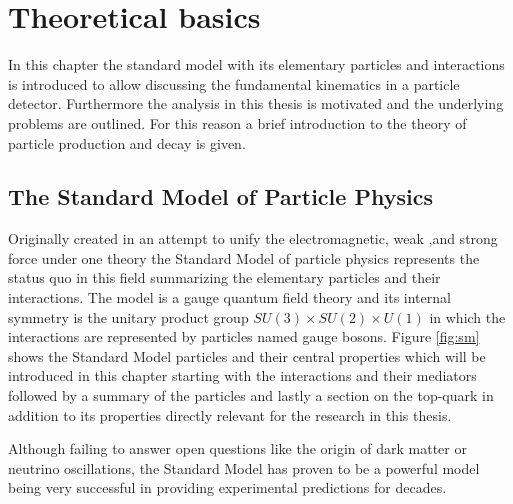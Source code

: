 
\chapter{Theoretical basics}

In this chapter the standard model with its elementary particles and interactions is introduced to allow discussing the fundamental kinematics in a particle detector.
Furthermore the analysis in this thesis is motivated and the underlying problems are outlined. For this reason a brief introduction to the theory of particle production and decay is given.


\section{The Standard Model of Particle Physics}
\label{sec:sm}

Originally created in an attempt to unify the electromagnetic, weak ,and strong force under one theory the Standard Model of particle physics represents the status quo in this field summarizing the elementary particles and their interactions.
The model is a gauge quantum field theory and its internal symmetry is the unitary product group $SU(3) \times SU(2) \times U(1)$ in which the interactions are represented by particles named gauge bosons.
Figure \ref{fig:sm} shows the Standard Model particles and their central properties which will be introduced in this chapter starting with the interactions and their mediators followed by a summary of the particles and lastly a section on the top-quark in addition to its properties directly relevant for the research in this thesis.

Although failing to answer open questions like the origin of dark matter or neutrino oscillations, the Standard Model has proven to be a powerful model being very successful in providing experimental predictions for decades.

